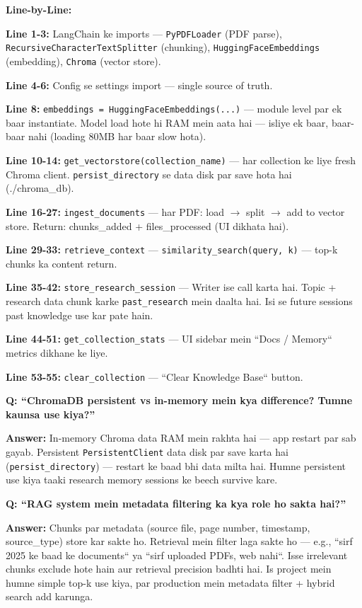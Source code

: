 \documentclass[11pt, a4paper]{article}
\begin{document}
\begin{codestorybox}
\textbf{Line-by-Line:}

\textbf{Line 1-3:} LangChain ke imports --- \texttt{PyPDFLoader} (PDF parse), \texttt{RecursiveCharacterTextSplitter} (chunking), \texttt{HuggingFaceEmbeddings} (embedding), \texttt{Chroma} (vector store).

\textbf{Line 4-6:} Config se settings import --- single source of truth.

\textbf{Line 8:} \texttt{embeddings = HuggingFaceEmbeddings(...)} --- module level par ek baar instantiate. Model load hote hi RAM mein aata hai --- isliye ek baar, baar-baar nahi (loading 80MB har baar slow hota).

\textbf{Line 10-14:} \texttt{get\_vectorstore(collection\_name)} --- har collection ke liye fresh Chroma client. \texttt{persist\_directory} se data disk par save hota hai (./chroma\_db).

\textbf{Line 16-27:} \texttt{ingest\_documents} --- har PDF: load $\rightarrow$ split $\rightarrow$ add to vector store. Return: chunks\_added + files\_processed (UI dikhata hai).

\textbf{Line 29-33:} \texttt{retrieve\_context} --- \texttt{similarity\_search(query, k)} --- top-k chunks ka content return.

\textbf{Line 35-42:} \texttt{store\_research\_session} --- Writer ise call karta hai. Topic + research data chunk karke \texttt{past\_research} mein daalta hai. Isi se future sessions past knowledge use kar pate hain.

\textbf{Line 44-51:} \texttt{get\_collection\_stats} --- UI sidebar mein ``Docs / Memory`` metrics dikhane ke liye.

\textbf{Line 53-55:} \texttt{clear\_collection} --- ``Clear Knowledge Base`` button.
\end{codestorybox}

\begin{interviewbox}
\textbf{Q: ``ChromaDB persistent vs in-memory mein kya difference? Tumne kaunsa use kiya?''}

\textbf{Answer:} In-memory Chroma data RAM mein rakhta hai --- app restart par sab gayab. Persistent \texttt{PersistentClient} data disk par save karta hai (\texttt{persist\_directory}) --- restart ke baad bhi data milta hai. Humne persistent use kiya taaki research memory sessions ke beech survive kare.
\end{interviewbox}

\begin{interviewbox}
\textbf{Q: ``RAG system mein metadata filtering ka kya role ho sakta hai?''}

\textbf{Answer:} Chunks par metadata (source file, page number, timestamp, source\_type) store kar sakte ho. Retrieval mein filter laga sakte ho --- e.g., ``sirf 2025 ke baad ke documents`` ya ``sirf uploaded PDFs, web nahi``. Isse irrelevant chunks exclude hote hain aur retrieval precision badhti hai. Is project mein humne simple top-k use kiya, par production mein metadata filter + hybrid search add karunga.
\end{interviewbox}
\end{document}
